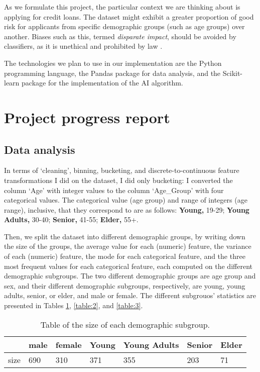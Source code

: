 \documentclass[conference]{IEEEtran}
\begin{document}
As we formulate this project, the particular context we are thinking about is applying for credit loans. The dataset might exhibit a greater proportion of good risk for applicants from specific demographic groups (such as age groups) over another. Biases such as this, termed \emph{disparate impact}, should be avoided by classifiers, as it is unethical and prohibited by law \cite{10.2307/24758720}.  

The technologies we plan to use in our implementation are the Python programming language, the Pandas package for data analysis, and the Scikit-learn package for the implementation of the AI algorithm.

\section{Project progress report}
\subsection{Data analysis}
In terms of `cleaning', binning, bucketing, and discrete-to-continuous feature transformations I did on the dataset, I did only bucketing: I converted the column `Age' with integer values to the column `Age\_Group' with four categorical values. The categorical value (age group) and range of integers (age range), inclusive, that they correspond to are as follows: \textbf{Young,} 19-29; \textbf{Young Adults,} 30-40; \textbf{Senior,} 41-55; \textbf{Elder,} 55+.

Then, we split the dataset into different demographic groups, by writing down the size of the groups, the average value for each (numeric) feature, the variance of each (numeric) feature, the mode for each categorical feature, and the three most frequent values for each categorical feature, each computed on the different demographic subgroups. The two different demographic groups are age group and sex, and their different demographic subgroups, respectively, are young, young adults, senior, or elder, and male or female. The different subgrouos' statistics are presented in Tables \ref{table:1}, \ref{table:2}, and \ref{table:3}.

\begin{table}[h]
\begin{center}
\caption{Table of the size of each demographic subgroup.}
\begin{tabularx}{0.49\textwidth} { |X|X|X|X|X|X|X| } 
    \hline
            & male & female & Young & Young Adults & Senior & Elder \\ 
        \hline
        size & 690  & 310    & 371   & 355          & 203    & 71    \\
        \hline
\end{tabularx}
\label{table:1}
\end{center}
\end{table}
\end{document}
